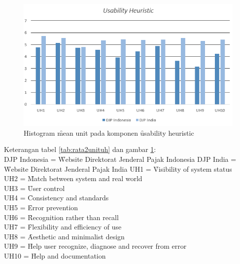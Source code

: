 \begin{figure}
	\centering
	\includegraphics[width=\textwidth]
	{pics/historata2uh.PNG}
	\caption{Histogram \f{mean} unit pada komponen \f{usability heuristic}}
	\label{fig:historata2uh}
\end{figure}
\noindent
Keterangan tabel \ref{tab:rata2unituh} dan gambar \ref{fig:historata2uh}: \\
DJP Indonesia = \f{Website} Direktorat Jenderal Pajak Indonesia
DJP India = \f{Website} Direktorat Jenderal Pajak India
UH1 = \f{Visibility of system status} \\
UH2 = \f{Match between system and real world} \\
UH3 = \f{User control} \\
UH4 = \f{Consistency and standards} \\
UH5 = \f{Error prevention} \\
UH6 = \f{Recognition rather than recall} \\
UH7 = \f{Flexibility and efficiency of use} \\
UH8 = \f{Aesthetic and minimalist design} \\
UH9 = \f{Help user recognize, diagnose and recover from error} \\
UH10 = \f{Help and documentation}
